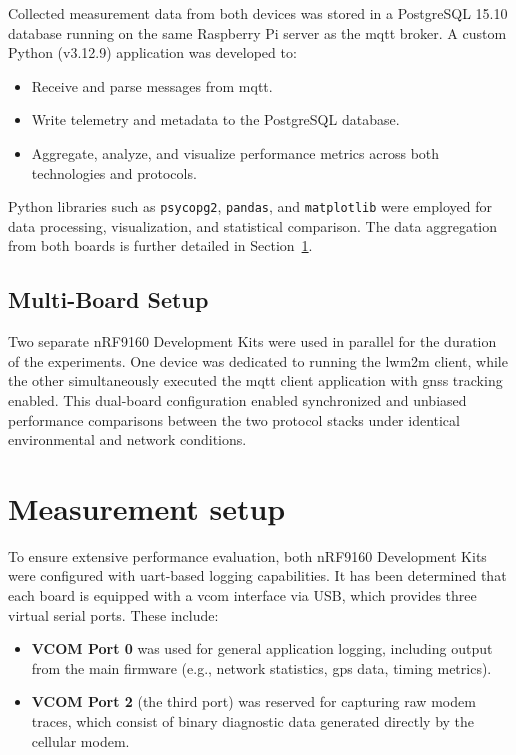 \documentclass[12pt, english, openany]{book}
\begin{document}
Collected measurement data from both devices was stored in a PostgreSQL 15.10 database running on the same Raspberry Pi server as the \gls{mqtt} broker. A custom Python (v3.12.9) application was developed to:
\begin{itemize}
    \item Receive and parse messages from \gls{mqtt}.
    \item Write telemetry and metadata to the PostgreSQL database.
    \item Aggregate, analyze, and visualize performance metrics across both technologies and protocols.
\end{itemize}

Python libraries such as \texttt{psycopg2}, \texttt{pandas}, and \texttt{matplotlib} were employed for data processing, visualization, and statistical comparison. The data aggregation from both boards is further detailed in Section~\ref{sec:measurement_setup}.

\subsection{Multi-Board Setup}

Two separate nRF9160 Development Kits were used in parallel for the duration of the experiments. One device was dedicated to running the \gls{lwm2m} client, while the other simultaneously executed the \gls{mqtt} client application with \gls{gnss} tracking enabled. This dual-board configuration enabled synchronized and unbiased performance comparisons between the two protocol stacks under identical environmental and network conditions.

\section{Measurement setup} \label{sec:measurement_setup}

To ensure extensive performance evaluation, both nRF9160 Development Kits were configured with \gls{uart}-based logging capabilities. It has been determined that each board is equipped with a \gls{vcom} interface via USB, which provides three virtual serial ports. These include:

\begin{itemize}
    \item \textbf{VCOM Port 0} was used for general application logging, including output from the main firmware (e.g., network statistics, \gls{gps} data, timing metrics).
    \item \textbf{VCOM Port 2} (the third port) was reserved for capturing raw modem traces, which consist of binary diagnostic data generated directly by the cellular modem.
\end{itemize}
\end{document}
